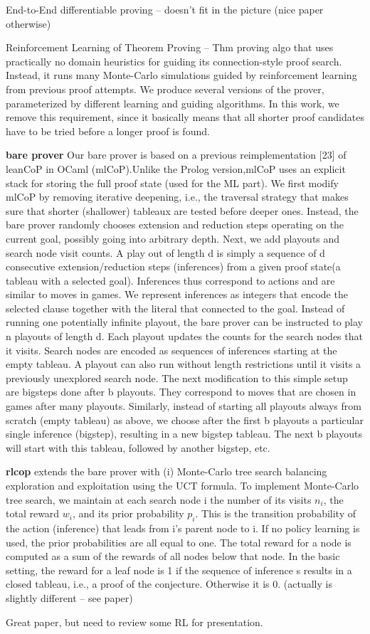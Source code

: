 \documentclass{article}
\begin{document}
End-to-End differentiable proving \cite{EndToEndDiffProving} -- doesn't fit in
the picture (nice paper otherwise)

Reinforcement Learning of Theorem Proving \cite{RLTP} -- Thm proving algo that
uses practically no domain heuristics for guiding its connection-style proof
search. Instead, it runs many Monte-Carlo simulations guided by reinforcement
learning from previous proof attempts. We produce several versions of the
prover, parameterized by different learning and guiding algorithms. In this work, we remove this requirement, since it basically means that all shorter proof candidates have to be tried before a longer proof is found.

\textbf{bare prover} Our bare prover is based on a previous reimplementation
[23] of leanCoP in OCaml (mlCoP).Unlike the Prolog version,mlCoP uses an
explicit stack for storing the full proof state (used for the ML part).  We
first modify mlCoP by removing iterative deepening, i.e., the traversal
strategy that makes sure that shorter (shallower) tableaux are  tested  before
deeper  ones.   Instead,  the  bare  prover  randomly  chooses  extension  and
reduction steps operating on the current goal, possibly going into arbitrary
depth. Next, we add playouts and search node visit counts. A play out of length
d is simply a sequence of d consecutive extension/reduction steps (inferences)
from a given proof state(a tableau with a selected goal). Inferences  thus
correspond  to actions and  are  similar  to  moves  in  games.   We  represent
inferences as integers that encode the selected clause together with the
literal that connected to the goal.  Instead of running one potentially
infinite playout, the bare prover can be instructed to play n playouts of
length d. Each playout updates the counts for the search nodes that it visits.
Search nodes are encoded as sequences of inferences starting at the empty
tableau. A playout can also run without length restrictions until it visits
a previously unexplored search node. The  next  modification  to  this  simple
setup  are bigsteps done  after b playouts.   They  correspond to moves that
are chosen in games after many playouts.  Similarly, instead of starting all
playouts always from scratch (empty tableau) as above, we choose after the
first b playouts a particular single inference  (bigstep),  resulting  in
a  new bigstep  tableau.   The  next b playouts  will  start  with  this
tableau, followed by another bigstep, etc.

\textbf{rlcop} extends the bare prover with (i) Monte-Carlo tree search balancing exploration and exploitation using the UCT formula. To implement Monte-Carlo tree search, we maintain at each search node i the number of its visits $n_i$, the total reward $w_i$, and its prior probability $p_i$. This is the transition probability of the action (inference) that leads from i's parent node to i. If no policy learning is used, the prior probabilities are all equal to one. The total reward for a node is computed as a sum of the rewards of all nodes below that node. In the basic setting, the reward for a leaf node is 1 if the sequence of inference s results in a closed tableau, i.e., a proof of the conjecture. Otherwise it is 0. (actually is slightly different -- see paper)

Great paper, but need to review some RL for presentation.





\end{document}
